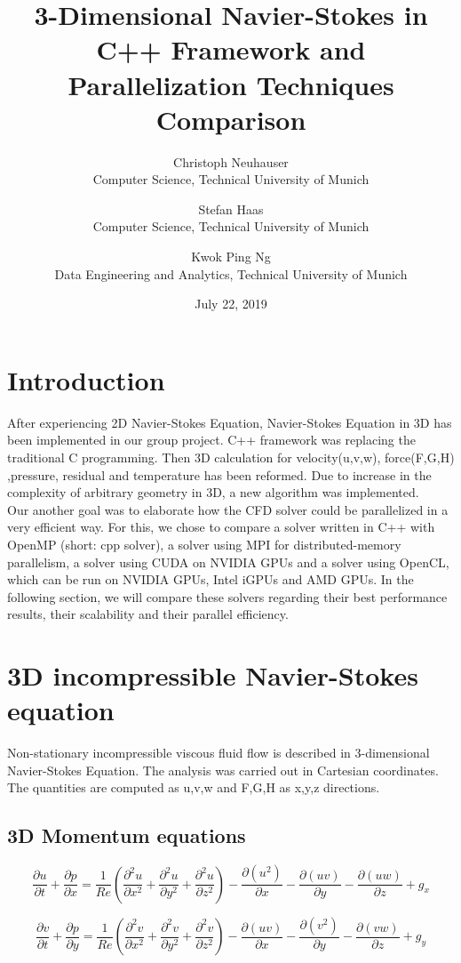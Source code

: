 \documentclass{article}%
\title{3-Dimensional Navier-Stokes in C++ Framework and Parallelization Techniques Comparison }
\date{July 22, 2019}
\author{Christoph Neuhauser\\ Computer Science, Technical University of Munich 
\and Stefan Haas\\ Computer Science, Technical University of Munich
\and Kwok Ping Ng\\ Data Engineering and Analytics, Technical University of Munich}
\begin{document}
\maketitle

\section{Introduction}

After experiencing 2D Navier-Stokes Equation, Navier-Stokes Equation in 3D has been implemented in our group project.  C++ framework was replacing the traditional C programming. Then 3D calculation for velocity(u,v,w), force(F,G,H) ,pressure, residual and temperature has been reformed.  Due to increase in the complexity of arbitrary geometry in 3D, a new algorithm was implemented.\\
Our another goal was to elaborate how the CFD solver could be parallelized in a very efficient way. For this, we chose to compare a solver written in C++ with OpenMP (short: cpp solver), a solver using MPI for distributed-memory parallelism, a solver using CUDA on NVIDIA GPUs and a solver using OpenCL, which can be run on NVIDIA GPUs, Intel iGPUs and AMD GPUs. In the following section, we will compare these solvers regarding their best performance results, their scalability and their parallel efficiency.

\section{3D incompressible Navier-Stokes equation}
Non-stationary incompressible viscous fluid flow is described in 3-dimensional Navier-Stokes Equation. The analysis was carried out in Cartesian coordinates. The quantities are computed as u,v,w and F,G,H as x,y,z directions.

\subsection{3D Momentum equations}
\begin{equation}
\frac{\partial u}{\partial t} + \frac{\partial p}{\partial x} = 
\frac{1}{Re} \left( \frac{\partial^2 u}{\partial x^2} + \frac{\partial^2 u}{\partial y^2} + \frac{\partial^2 u}{\partial z^2} \right) - 
\frac{\partial(u^2)}{\partial x} -\frac{\partial (uv)}{\partial y} - 
\frac{\partial (uw)}{\partial z} +
g_x 
\end{equation}

\begin{equation}
\frac{\partial v}{\partial t} + \frac{\partial p}{\partial y} = 
\frac{1}{Re} \left( \frac{\partial^2 v}{\partial x^2} + \frac{\partial^2 v}{\partial y^2} + \frac{\partial^2 v}{\partial z^2} \right) - 
\frac{\partial(uv)}{\partial x} -\frac{\partial (v^2)}{\partial y} - 
\frac{\partial (vw)}{\partial z} +
g_y
\end{equation}
\end{document}
